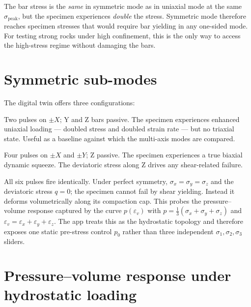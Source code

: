 \documentclass[11pt,a4paper,openany]{book}
\theoremstyle{handbook}
\newcommand{\sig}{\sigma}
\newcommand{\eps}{\varepsilon}
\newcommand{\sigpeak}{\sig_{\text{peak}}}
\begin{document}
\begin{warningbox}
The bar stress is the \emph{same} in symmetric mode as in uniaxial mode at
the same $\sigpeak$, but the specimen experiences \emph{double} the stress.
Symmetric mode therefore reaches specimen stresses that would require bar
yielding in any one-sided mode. For testing strong rocks under high
confinement, this is the only way to access the high-stress regime without
damaging the bars.
\end{warningbox}

\section{Symmetric sub-modes}

The digital twin offers three configurations:

\begin{description}[leftmargin=2em,style=nextline]
  \item[Symmetric $\pm X$ only]
    Two pulses on $\pm X$; Y and Z bars passive. The specimen experiences
    enhanced uniaxial loading --- doubled stress and doubled strain rate
    --- but no triaxial state. Useful as a baseline against which the
    multi-axis modes are compared.
  \item[Symmetric $\pm X\pm Y$ (biaxial)]
    Four pulses on $\pm X$ and $\pm Y$; Z passive. The specimen experiences
    a true biaxial dynamic squeeze. The deviatoric stress along Z drives
    any shear-related failure.
  \item[Full hydrostatic ($\pm X,\pm Y,\pm Z$)]
    All six pulses fire identically. Under perfect symmetry,
    $\sig_x=\sig_y=\sig_z$ and the deviatoric stress $q=0$; the specimen
    cannot fail by shear yielding. Instead it deforms volumetrically along
    its compaction cap. This probes the pressure--volume response captured
    by the curve $p(\eps_v)$ with $p=\tfrac{1}{3}(\sig_x+\sig_y+\sig_z)$
    and $\eps_v=\eps_x+\eps_y+\eps_z$. The app treats this as the
    hydrostatic topology and therefore exposes one static pre-stress
    control $p_0$ rather than three independent $\sig_1,\sig_2,\sig_3$
    sliders.
\end{description}

\section{Pressure--volume response under hydrostatic loading}
\end{document}
